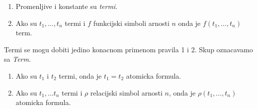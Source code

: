 \documentclass[12p,14paper]{article}
\begin{document}
\begin{multicols}{2}
    \begin{enumerate}
        \itemsep0em
        \item Promenljive i konstante su \textit{termi}.
        \item Ako su $t_1, \ldots, t_n$ termi i $f$ funkcijski simboli arnosti 
              $n$ onda je $f(t_1, \ldots, t_n)$ term.
    \end{enumerate}
    Termi se mogu dobiti jedino konacnom primenom pravila 1 i 2. Skup 
    oznacavamo sa \textit{Term}.

    \begin{enumerate}
        \itemsep0em
        \item Ako su $t_1$ i $t_2$ termi, onda je $t_1 = t_2$ atomicka formula.
        \item Ako su $t_1, \ldots t_n$ termi i $\rho$ relacijski simbol 
              arnosti $n$, onda je $\rho(t_1, \ldots, t_n)$ atomicka formula.
    \end{enumerate}

\end{multicols}
\end{document}
